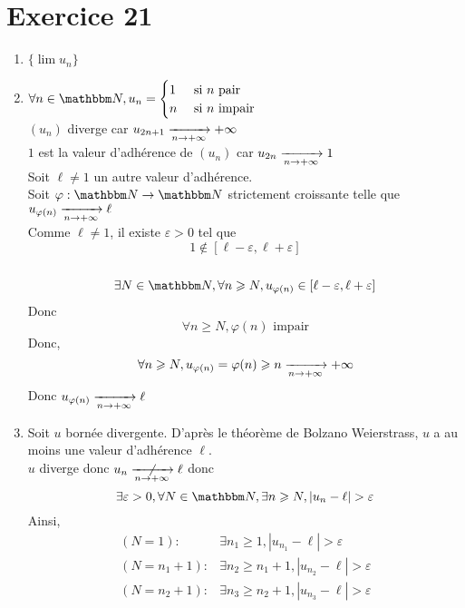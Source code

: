 \part{Exercice 21}

\begin{enumerate}
	\item $\{\lim u_n\}$ 
	\item  $\forall n \in \N, u_n = \begin{cases}
			1 &\text{ si } n \text{ pair}\\
			n &\text{ si } n \text{ impair}
		\end{cases}$\\

		$(u_n)$ diverge car $u_{2n+1} \xrightarrow[n \to +\infty]{} +\infty$ \\
		$1$ est la valeur d'adhérence de $(u_n)$ car $u_{2n} \xrightarrow[n \to +\infty]{} 1$\\

		Soit $\ell \neq 1$ un autre valeur d'adhérence.\\
		Soit $\varphi : \N \to \N$ strictement croissante telle que $u_{\varphi(n)} \xrightarrow[n \to +\infty]{} \ell$ \\
		Comme $\ell \neq 1$, il existe $\varepsilon > 0$ tel que \[
			1 \not\in [\ell - \varepsilon, \ell + \varepsilon]
		\]\\
		\[
			\exists N \in \N, \forall n \ge N, u_{\varphi(n)} \in [\ell-\varepsilon, \ell + \varepsilon]
		\] Donc \[
		\forall n \ge N,  \varphi(n) \text{ impair}
		\] Donc, \[
		\forall n \geqslant  N, u_{\varphi(n)} = \varphi(n) \geqslant n \xrightarrow[n \to +\infty]{} +\infty
		\] Donc $u_{\varphi(n)} \xrightarrow[n \to +\infty]{} \ell$
	\item Soit $u$ bornée divergente. D'après le théorème de Bolzano Weierstrass, $u$ a au moins une valeur d'adhérence $\ell$.\\
		$u$ diverge donc $u_n \centernot{\tendsto{n \to +\infty}} \ell$
		donc \[
			\exists  \varepsilon > 0, \forall N \in \N, \exists n \ge  N, \left| u_n - \ell \right| > \varepsilon
		\] Ainsi,
		\begin{align*}
			(N = 1): & \exists n_1 \ge 1, \left| u_{n_1} - \ell \right| > \varepsilon\\
			(N = n_1 + 1): & \exists n_2 \ge n_1+1, \left| u_{n_2} - \ell \right| > \varepsilon\\
			(N = n_2 + 1): & \exists n_3 \ge n_2+1, \left| u_{n_3} - \ell \right| > \varepsilon\\
		\end{align*}


\end{enumerate}
